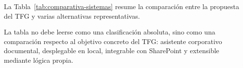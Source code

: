 La Tabla~\ref{tab:comparativa-sistemas} resume la comparación entre la propuesta del TFG y varias alternativas representativas.

\begin{table}[H]
\centering
\caption{Comparación del sistema JARVIS con soluciones alternativas.}
\label{tab:comparativa-sistemas}
\end{table}

La tabla no debe leerse como una clasificación absoluta, sino como una comparación respecto al objetivo concreto del TFG: asistente corporativo documental, desplegable en local, integrable con SharePoint y extensible mediante lógica propia.

